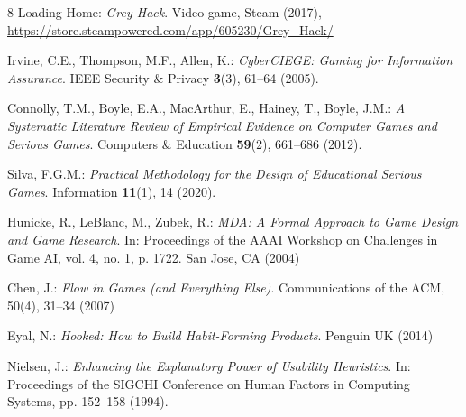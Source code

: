 \documentclass[runningheads]{llncs}
\begin{document}
\begin{thebibliography}{8}
Loading Home:
\textit{Grey Hack}.
Video game, Steam (2017), \url{https://store.steampowered.com/app/605230/Grey_Hack/}

Irvine, C.E., Thompson, M.F., Allen, K.:
\textit{CyberCIEGE: Gaming for Information Assurance}.
IEEE Security \& Privacy \textbf{3}(3), 61--64 (2005).

Connolly, T.M., Boyle, E.A., MacArthur, E., Hainey, T., Boyle, J.M.:
\textit{A Systematic Literature Review of Empirical Evidence on Computer Games and Serious Games}.
Computers \& Education \textbf{59}(2), 661--686 (2012).

Silva, F.G.M.:
\textit{Practical Methodology for the Design of Educational Serious Games}.
Information \textbf{11}(1), 14 (2020).

Hunicke, R., LeBlanc, M., Zubek, R.:
\textit{MDA: A Formal Approach to Game Design and Game Research}.
In: Proceedings of the AAAI Workshop on Challenges in Game AI,
vol. 4, no. 1, p. 1722. San Jose, CA (2004)

Chen, J.:
\textit{Flow in Games (and Everything Else)}.
Communications of the ACM,
50(4), 31--34 (2007)

Eyal, N.:
\textit{Hooked: How to Build Habit-Forming Products}.
Penguin UK (2014)

Nielsen, J.:
\textit{Enhancing the Explanatory Power of Usability Heuristics}.
In: Proceedings of the SIGCHI Conference on Human Factors in Computing Systems,
pp. 152--158 (1994).

\end{thebibliography}
\end{document}
